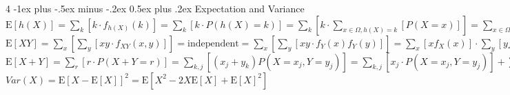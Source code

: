 \documentclass[10pt,landscape]{article}
\makeatletter
\newcommand{\expect}[1]{\mathrm{E} \left[ {#1} \right]}
\renewcommand{\section}{\@startsection{section}{1}{0mm}
                                {-1ex plus -.5ex minus -.2ex}
                                {0.5ex plus .2ex}
                                {\normalfont\large\bfseries}}
\makeatother
\begin{document}
\begin{multicols}{4}
\section{Expectation and Variance}
\begin{math}
  \expect{h(X)} = \sum_k \left[ k \cdot f_{h(X)}(k) \right]
                = \sum_k \left[ k \cdot P(h(X) = k) \right]
                = \sum_k \left[ k \cdot \sum_{x \in \Omega, h(X) = k} \left[ P(X = x) \right] \right]
                = \sum_{x \in \Omega} \left[ \sum_{k, h(X) = k} \left[ k \cdot P(X = x) \right] \right]
                = \sum_{x \in \Omega} \left[ h(x) \cdot P(X = x) \right]
                = \sum_{x \in \Omega} \left[ h(x) \cdot f_x(x) \right]
\end{math} \\[2pt]
\begin{math} \end{math} \\[2pt]
\begin{math}
  \expect{XY} = \sum_x \left[ \sum_y \left[ xy \cdot f_{XY}(x,y) \right] \right]
              = \text{independent}
              = \sum_x \left[ \sum_y \left[ xy \cdot f_Y(x)f_Y(y) \right] \right]
              = \sum_x \left[ xf_X(x) \right] \cdot \sum_y \left[ yf_Y(y) \right]
              = \expect{X} \cdot \expect{Y}
\end{math} \\[2pt]
\begin{math} \end{math} \\[2pt]
\begin{math}
  \expect{X + Y} = \sum_r \left[ r \cdot P(X + Y = r) \right]
                 = \sum_{k,j} \left[ (x_j + y_k) P(X = x_j,Y = y_j) \right]
                 = \sum_{k,j} \left[ x_j \cdot P(X=x_j,Y=y_j) \right] + 
                   \sum_{k,j} \left[ y_k \cdot P(X=x_j,Y=y_j) \right] 
                 = \sum_j \left[ x_j \sum_k \left[ P(X = x_j, Y = y_j) \right] \right] + 
                   \sum_k \left[ y_k \sum_y \left[ P(X = x_j, Y = y_j) \right] \right]
                 = \sum_j \left[ x_j \cdot P(X = x_j) \right] + \sum_k \left[ y_k \cdot P(Y = y_k) \right] 
                 = \expect{X} \expect{Y}
\end{math} \\[2pt]
\begin{math} \end{math} \\[2pt]
\begin{math}
  Var(X) = \expect{X - \expect{X}}^2
         = \expect{X^2 - 2X \expect{X} + \expect{X}^2}

\end{math}
\end{multicols}
\end{document}
